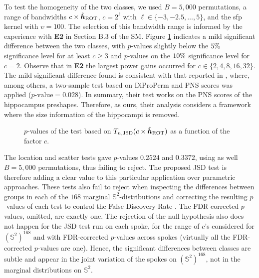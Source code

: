 \documentclass[oneside,11pt]{article}
\begin{document}
To test the homogeneity of the two classes, we used $B=5,\!000$ permutations, a range of bandwidths $c\times \hat{{\boldsymbol{h}}}_\mathrm{ROT}$, $c=2^\ell$ with $\ell\in\{-3,-2.5,\ldots,5\}$, and the sfp kernel with $\upsilon=100$. The selection of this bandwidth range is informed by the experience with \textbf{E2} in Section B.3 of the SM. Figure \ref{fig:hippotest} indicates a mild significant difference between the two classes, with $p$-values slightly below the $5\%$ significance level for at least $c\geq 3$ and $p$-values on the $10\%$ significance level for $c=2$. Observe that in \textbf{E2} the largest power gains occurred for $c\in\{2,4,8,16,32\}$. The mild significant difference found is consistent with that reported in \citet[Section 7.4]{liu2023analysis}, where, among others, a two-sample test based on DiProPerm \citep{Wei2016} and PNS scores was applied ($p\text{-value}=0.028$). In summary, their test works on the PNS scores of the hippocampus preshapes. %
Therefore, as ours, their analysis considers a framework where the size information of the hippocampi is removed.

\begin{figure}[htpb!]
    \centering
    \caption{\small $p$-values of the test based on $T_{n,\mathrm{JSD}}(c\times\hat{{\boldsymbol{h}}}_\mathrm{ROT})$ as a function of the factor $c$.}
    \label{fig:hippotest}
\end{figure}

The location and scatter tests gave $p$-values $0.2524$ and $0.3372$, using as well $B=5,\!000$ permutations, thus failing to reject. The proposed JSD test is therefore adding a clear value to this particular application over parametric approaches. These tests also fail to reject when inspecting the differences between groups in each of the $168$ marginal $\mathbb{S}^2$-distributions and correcting the resulting $p$-values of each test to control the False Discovery Rate \citep[FDR;][]{Benjamini2001}. The FDR-corrected $p$-values, omitted, are exactly one. The rejection of the null hypothesis also does not happen for the JSD test run on each spoke, for the range of $c$'s considered for $(\mathbb{S}^2)^{168}$ and with FDR-corrected $p$-values across spokes (virtually all the FDR-corrected $p$-values are one). Hence, the significant differences between classes are subtle and appear in the joint variation of the spokes on $(\mathbb{S}^2)^{168}$, not in the marginal distributions on $\mathbb{S}^2$.
\end{document}
